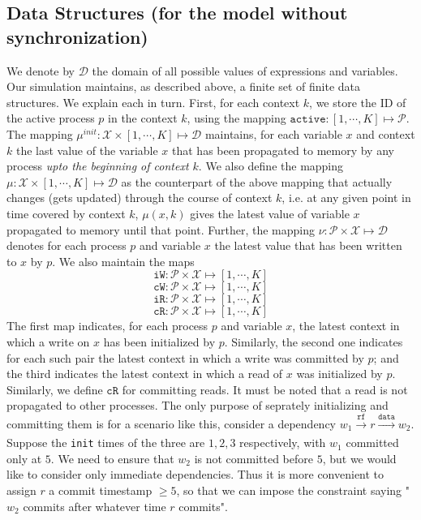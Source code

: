\documentclass{article}
\newcommand{\var}{\texttt}
\begin{document}
\subsection{Data Structures (for the model without synchronization)}
We denote by $\mathcal{D}$ the domain of all possible values of expressions and variables. Our simulation maintains, as described above, a finite set of finite data structures. We explain each in turn. First, for each context $k$, we store the ID of the active process $p$ in the context $k$, using the mapping $\texttt{active}: [1,\cdots,K] \mapsto \mathcal{P}$. The mapping $\mu^{init}: \mathcal{X} \times [1,\cdots,K] \mapsto \mathcal{D}$ maintains, for each variable $x$ and context $k$ the last value of the variable $x$ that has been propagated to memory by any process \textit{upto the beginning of context $k$}. We also define the mapping $\mu: \mathcal{X} \times [1,\cdots,K] \mapsto \mathcal{D}$ as the counterpart of the above mapping that actually changes (gets updated) through the course of context $k$, i.e. at any given point in time covered by context $k$, $\mu(x,k)$ gives the latest value of variable $x$ propagated to memory until that point.  Further, the mapping $\nu: \mathcal{P} \times \mathcal{X} \mapsto \mathcal{D}$ denotes for each process $p$ and variable $x$ the latest value that has been written to $x$ by $p$. We also maintain the maps $$\texttt{iW}: \mathcal{P} \times \mathcal{X} \mapsto [1,\cdots,K]$$
$$\texttt{cW}: \mathcal{P} \times \mathcal{X} \mapsto [1,\cdots,K]$$
$$\texttt{iR}: \mathcal{P} \times \mathcal{X} \mapsto [1,\cdots,K]$$
$$\texttt{cR}: \mathcal{P} \times \mathcal{X} \mapsto [1,\cdots,K]$$
The first map indicates, for each process $p$ and variable $x$, the latest context in which a write on $x$ has been initialized by $p$. Similarly, the second one indicates for each such pair the latest context in which a write was committed by $p$; and the third indicates the latest context in which a read of $x$ was initialized by $p$. Similarly, we define $\var{cR}$ for committing reads. It must be noted that a read is not propagated to other processes. The only purpose of seprately initializing and committing them is for a scenario like this, consider a dependency $w_1 \xrightarrow[]{\var{rf}} r \xrightarrow[]{\var{data}} w_2$. Suppose the \var{init} times of the three are $1,2,3$ respectively, with $w_1$ committed only at $5$. We need to ensure that $w_2$ is not committed before $5$, but we would like to consider only immediate dependencies. Thus it is more convenient to assign $r$ a commit timestamp $\geq 5$, so that we can impose the constraint saying "$w_2$ commits after whatever time $r$ commits".\\
\end{document}
